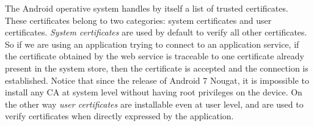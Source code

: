 			\par The Android operative system handles by itself a list of trusted certificates. These certificates belong to two categories: system certificates and user certificates. \newline
			\textit{System certificates} are used by default to verify all other certificates. So if we are using an application trying to connect to an application service, if the certificate obtained by the web service is traceable to one certificate already present in the system store, then the certificate is accepted and the connection is established. Notice that since the release of Android 7 Nougat, it is impossible to install any CA at system level without having root privileges on the device. \newline
			On the other way \textit{user certificates} are installable even at user level, and are used to verify certificates when directly expressed by the application.
			
